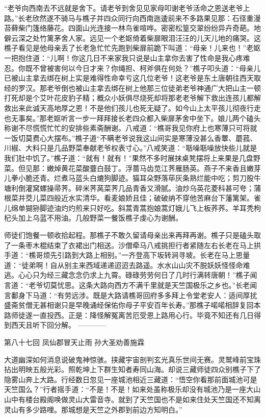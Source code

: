 \documentclass[12pt,UTF8]{ctexbook}
\begin{document}
{	“老爷向西南去不远就是舍下。请老爷到舍见见家母叩谢老爷活命之恩送老爷上路。”长老欣然遂不骑马与樵子并四众同行向西南迤逶前来不多路果见那：石径重漫苔藓柴门篷络藤花。四面山光连接一林鸟雀喧哗。密密松篁交翠纷纷异卉奇葩。地僻云深之处竹篱茅舍人家。远见一个老妪倚着柴扉眼泪汪汪的儿天儿地的痛哭。这樵子看见是他母亲丢了长老急忙忙先跑到柴扉前跪下叫道：“母亲！儿来也！”老妪一把抱住道：“儿啊！你这几日不来家我只说是山主拿你去害了性命是我心疼难忍。你既不曾被害何以今日才来？你绳担、柯斧俱在何处？”樵子叩头道：“母亲儿已被山主拿去绑在树上实是难得性命幸亏这几位老爷！这老爷是东土唐朝往西天取经的罗汉。那老爷倒也被山主拿去绑在树上他那三位徒弟老爷神通广大把山主一顿打死却是个艾叶花皮豹子精；概众小妖俱尽烧死却将那老老爷解下救出连孩儿都解救出来此诚天高地厚之恩！不是他们孩儿也死无疑了。如今山上太平孩儿彻夜行走也无事矣。”那老妪听言一步一拜拜接长老四众都入柴扉茅舍中坐下。娘儿两个磕头称谢不尽慌慌忙忙的安排些素斋酬谢。八戒道：“樵哥我见你府上也寒薄只可将就一饭切莫费心大摆布。”樵子道“不瞒老爷说我这山间实是寒薄没甚么香蕈、蘑菰、川椒、大料只是几品野菜奉献老爷权表寸心。”八戒笑道：“聒噪聒噪放快些儿就是我们肚中饥了。”樵子道：“就有！就有！”果然不多时展抹桌凳摆将上来果是几盘野菜。但见那：嫩焯黄花菜酸虀白鼓丁。浮蔷马齿苋江荠雁肠英。燕子不来香且嫩芽儿拳小脆还青。烂煮马蓝头白熝狗脚迹。猫耳朵野落荜灰条熟烂能中吃；剪刀股牛塘利倒灌窝螺操帚荠。碎米荠莴菜荠几品青香又滑腻。油炒乌英花菱科甚可夸；蒲根菜并茭儿菜四般近水实清华。看麦娘娇且佳；破破纳不穿他苦麻台下藩篱架。雀儿绵单猢狲脚迹油灼灼煎来只好吃。斜蒿青蒿抱娘蒿灯娥儿飞上板荞荞。羊耳秃枸杞头加上乌蓝不用油。几般野菜一餐饭樵子虔心为谢酬。
	
	师徒们饱餐一顿收拾起程。那樵子不敢久留请母亲出来再拜再谢。樵子只是磕头取了一条枣木棍结束了衣裙出门相送。沙僧牵马八戒挑担行者紧随左右长老在马上拱手道：“樵哥烦先引路到大路上相别。”一齐登高下坂转涧寻坡。长老在马上思量道：“徒弟啊！自从别主来西域递递迢迢去路遥。水水山山灾不脱妖妖怪怪命难逃。心心只为经三藏念念仍求上九霄。碌碌劳劳何日了几时行满转唐朝！”樵子闻言道：“老爷切莫忧思。这条大路向西方不满千里就是天竺国极乐之乡也。”长老闻言鄱身下马道：“有劳远涉。既是大路请樵哥回府多多拜上令堂老安人：适间厚扰盛斋贫僧无甚相谢只是早晚诵经保佑你母子平安百年长寿。”那樵子喏喏相辞复回本路师徒遂一直投西。正是：降怪解冤离苦厄受恩上路用心行。毕竟不知还有几日得到西天且听下回分解。
	------------
	
	第八十七回 凤仙郡冒天止雨 孙大圣劝善施霖
	
	大道幽深如何消息说破鬼神惊骇。挟藏宇宙剖判玄光真乐世间无赛。灵鹫峰前宝珠拈出明映五般光彩。照乾坤上下群生知者寿同山海。却说三藏师徒四众别樵子下了隐雾山奔上大路。行经数日忽见一座城池相近三藏道：“悟空你看那前面城池可是天竺国么？”行者摇手道：“不是！不是！如来处虽称极乐却没有城池乃是一座大山山中有楼台殿阁唤做灵山大雷音寺。就到了天竺国也不是如来住处天竺国还不知离灵山有多少路哩。那城想是天竺之外郡到前边方知明白。”
	
}
\end{document}
